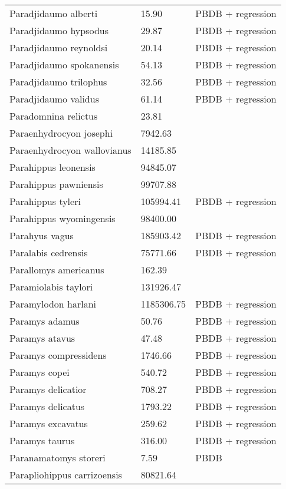 \documentclass{article}
\begin{document}
\begin{center}
\begin{longtable}{p{} p{} p{} }
  Paradjidaumo alberti & 15.90 & PBDB + regression \\ 
  Paradjidaumo hypsodus & 29.87 & PBDB + regression \\ 
  Paradjidaumo reynoldsi & 20.14 & PBDB + regression \\ 
  Paradjidaumo spokanensis & 54.13 & PBDB + regression \\ 
  Paradjidaumo trilophus & 32.56 & PBDB + regression \\ 
  Paradjidaumo validus & 61.14 & PBDB + regression \\ 
  Paradomnina relictus & 23.81 & \cite{Tomiya2013} \\ 
  Paraenhydrocyon josephi & 7942.63 & \cite{Tomiya2013} \\ 
  Paraenhydrocyon wallovianus & 14185.85 & \cite{Tomiya2013} \\ 
  Parahippus leonensis & 94845.07 & \cite{Tomiya2013} \\ 
  Parahippus pawniensis & 99707.88 & \cite{Tomiya2013} \\ 
  Parahippus tyleri & 105994.41 & PBDB + regression \\ 
  Parahippus wyomingensis & 98400.00 & \cite{MacFadden1986} \\ 
  Parahyus vagus & 185903.42 & PBDB + regression \\ 
  Paralabis cedrensis & 75771.66 & PBDB + regression \\ 
  Parallomys americanus & 162.39 & \cite{Tomiya2013} \\ 
  Paramiolabis taylori & 131926.47 & \cite{Tomiya2013} \\ 
  Paramylodon harlani & 1185306.75 & PBDB + regression \\ 
  Paramys adamus & 50.76 & PBDB + regression \\ 
  Paramys atavus & 47.48 & PBDB + regression \\ 
  Paramys compressidens & 1746.66 & PBDB + regression \\ 
  Paramys copei & 540.72 & PBDB + regression \\ 
  Paramys delicatior & 708.27 & PBDB + regression \\ 
  Paramys delicatus & 1793.22 & PBDB + regression \\ 
  Paramys excavatus & 259.62 & PBDB + regression \\ 
  Paramys taurus & 316.00 & PBDB + regression \\ 
  Paranamatomys storeri & 7.59 & PBDB \\ 
  Parapliohippus carrizoensis & 80821.64 & \cite{Tomiya2013} \\ 

\end{longtable}
\end{center}
\end{document}
